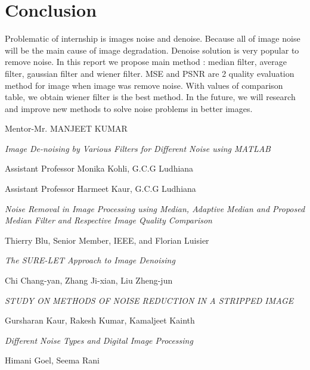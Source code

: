 \chapter{Conclusion}
Problematic of internship is images noise and denoise. Because all of image noise will be the main cause of image degradation. Denoise solution is very popular to remove noise. In this report we propose main method : median filter, average filter, gaussian filter and wiener filter. MSE and PSNR are 2 quality evaluation method for image when image was remove noise. With values of comparison table, we obtain wiener filter is the best method. In the future, we will research and improve new methods to solve noise problems in better images.

\begin{thebibliography}{9}
	
	
	

    Mentor-Mr. MANJEET KUMAR

    	
    	\textit{Image De-noising by
    	Various Filters for
    	Different Noise using
    	MATLAB }

Assistant Professor Monika Kohli, G.C.G Ludhiana

Assistant Professor Harmeet Kaur, G.C.G Ludhiana

\textit{Noise Removal in Image Processing using Median, Adaptive Median and Proposed Median Filter and Respective Image Quality Comparison}

	Thierry Blu, Senior Member, IEEE, and Florian Luisier
	
	\textit{The SURE-LET Approach to Image Denoising}





Chi Chang-yan, Zhang Ji-xian, Liu Zheng-jun

\textit{STUDY ON METHODS OF NOISE REDUCTION IN A STRIPPED IMAGE}

Gursharan Kaur, Rakesh Kumar, Kamaljeet Kainth

\textit{Different Noise Types and Digital Image Processing}

Himani Goel, Seema Rani


\end{thebibliography}
